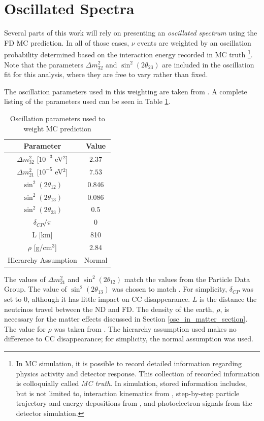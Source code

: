 \section{Oscillated Spectra}
\label{osc_weight_section}

Several parts of this work will rely on presenting an
\textit{oscillated spectrum} using the FD MC prediction.
In all of those cases, $\nu$ events are weighted by an oscillation
probability determined based on the interaction energy recorded in MC truth
\footnote{In MC simulation, it is possible to record detailed information
regarding physics activity and detector response.  This collection
of recorded information is colloquially called \textit{MC truth}.
In \nova simulation, stored information includes, but is not limited to,
interaction kinematics from \genie, step-by-step particle trajectory and energy
depositions from \geant, and photoelectron signals from the detector
simulation.}.
Note that the parameters $\Delta m_{32}^{2}$ and $\sin^2(2\theta_{23})$
are included in the oscillation fit for this analysis,
where they are free to vary rather than fixed.

The oscillation parameters used in this weighting are taken from
\cite{pdg, nova2016nue,nova2016numu, bassin2000crust}.
A complete listing of the parameters used can be seen in Table
\ref{osc_par_table}.



\begin{table}
\begin{center}
\begin{tabular}{|c|c|}
\hline
\textbf{Parameter} & \textbf{Value}\tabularnewline
\hline
\hline
$\Delta m_{32}^{2}$ [$10^{-3}$ eV$^2$] & $2.37$ \tabularnewline
\hline
$\Delta m_{21}^{2}$ [$10^{-5}$ eV$^2$] & $7.53$ \tabularnewline
\hline
$\sin^2(2\theta_{12})$ & 0.846 \tabularnewline
\hline
$\sin^2(2\theta_{13})$ & 0.086 \tabularnewline
\hline
$\sin^2(2\theta_{23})$ & 0.5 \tabularnewline
\hline
$\delta_{CP} / \pi$ & 0 \tabularnewline
\hline
L [km] & 810 \tabularnewline
\hline
$\rho$ [g/cm$^3$] & 2.84 \tabularnewline
\hline
Hierarchy Assumption& Normal \tabularnewline
\hline
\end{tabular}
\end{center}
\caption{Oscillation parameters used to weight MC prediction}
{
The values of $\Delta m_{21}^{2}$ and $\sin^2(2\theta_{12})$ match the values
from the Particle Data Group. The value of $\sin^2(2\theta_{13})$
was chosen to match \cite{nova2016nue}.
For simplicity, $\delta_{CP}$ was set to 0, although it has little impact on
\numu CC disappearance.
$L$ is the distance the neutrinos travel between the ND and FD.
The density of the earth, $\rho$, is necessary for the matter effects
discussed in Section \ref{osc_in_matter_section}.
The value for $\rho$ was taken from \cite{bassin2000crust}.
The hierarchy assumption used makes no difference to \numu CC disappearance;
for simplicity, the normal assumption was used.
}
\label{osc_par_table}
\end{table}


